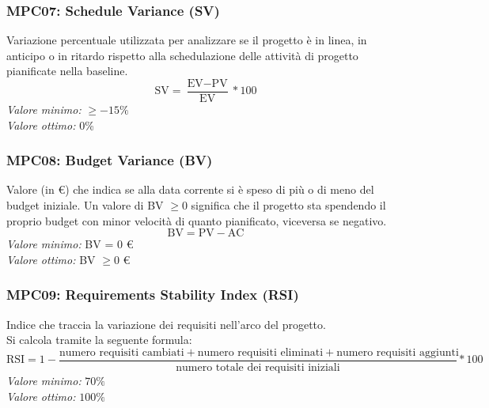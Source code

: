 \subsubsection{MPC07: Schedule Variance (SV)}
Variazione percentuale utilizzata per analizzare se il progetto è in linea, in anticipo o in ritardo rispetto alla schedulazione delle attività di progetto pianificate nella baseline.
\begin{equation*}
\text{SV}=\frac{\text{EV}-\text{PV}}{\text{EV}}*100
\end{equation*}
\textit{Valore minimo:} $\ge -15\%$\\
\textit{Valore ottimo:} 0\%
\subsubsection{MPC08: Budget Variance (BV)}
Valore (in \euro) che indica se alla data corrente si è speso di più o di meno del budget iniziale. Un valore di BV $\ge 0$ significa che il progetto sta spendendo il proprio budget con minor velocità di quanto pianificato, viceversa se negativo.
\begin{equation*}
\text{BV}=\text{PV}-\text{AC}
\end{equation*}
\textit{Valore minimo:} BV = 0 \euro\\
\textit{Valore ottimo:} BV $\ge 0 $ \euro

\subsubsection{MPC09: Requirements Stability Index (RSI)}
 Indice che traccia la variazione dei requisiti nell'arco del progetto.\\
 Si calcola tramite la seguente formula:
\begin{equation*}
\text{RSI}=1-\frac{\text{numero requisiti cambiati}+\text{numero requisiti eliminati}+\text{numero requisiti aggiunti}}{\text{numero totale dei requisiti iniziali}}*100
\end{equation*}
\textit{Valore minimo:} $70\%$\\
 \textit{Valore ottimo:} $100\%$

